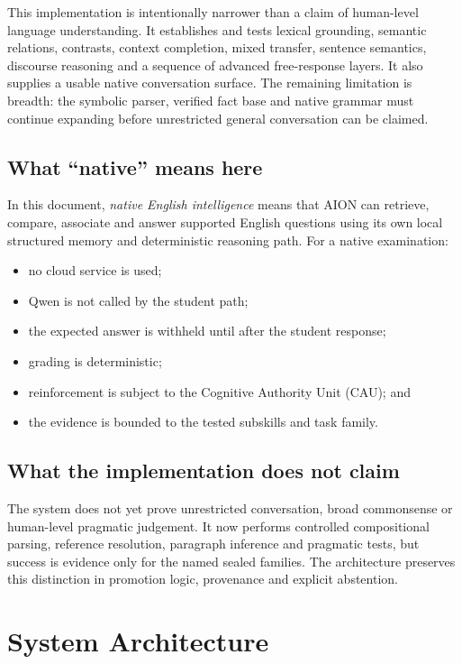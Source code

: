 \documentclass[11pt,a4paper]{article}
\begin{document}
This implementation is intentionally narrower than a claim of human-level language
understanding. It establishes and tests lexical grounding, semantic relations, contrasts,
context completion, mixed transfer, sentence semantics, discourse reasoning and a sequence
of advanced free-response layers. It also supplies a usable native conversation surface.
The remaining limitation is breadth: the symbolic parser, verified fact base and native
grammar must continue expanding before unrestricted general conversation can be claimed.

\subsection{What ``native'' means here}

In this document, \emph{native English intelligence} means that AION can retrieve, compare,
associate and answer supported English questions using its own local structured memory and
deterministic reasoning path. For a native examination:

\begin{itemize}
  \item no cloud service is used;
  \item Qwen is not called by the student path;
  \item the expected answer is withheld until after the student response;
  \item grading is deterministic;
  \item reinforcement is subject to the Cognitive Authority Unit (CAU); and
  \item the evidence is bounded to the tested subskills and task family.
\end{itemize}

\subsection{What the implementation does not claim}

The system does not yet prove unrestricted conversation, broad commonsense or human-level
pragmatic judgement. It now performs controlled compositional parsing, reference resolution,
paragraph inference and pragmatic tests, but success is evidence only for the named sealed
families. The architecture preserves this distinction in promotion logic, provenance and
explicit abstention.

\section{System Architecture}
\end{document}
